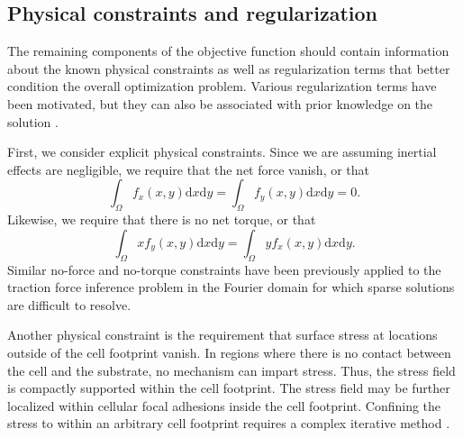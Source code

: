 \documentclass[aps,prl,reprint,groupedaddress,twocolumn]{revtex4-1}
\def\dd{\mbox{d}}
\begin{document}
\subsection{Physical constraints and regularization}

The remaining components of the objective function should contain
information about the known physical constraints as well as
regularization terms that better condition the overall optimization
problem. Various regularization terms have been motivated, but they
can also be associated with prior knowledge on the solution
\cite{PATHINTEGRAL}. 

First, we consider explicit physical constraints. Since we are
assuming inertial effects are negligible, we require that the net
force vanish, or that
\begin{equation}
\int_\Omega f_{x}(x,y)\dd x \dd y= \int_\Omega f_{y}(x,y)\dd x \dd y = 0.
\label{NOFORCE}
\end{equation}
Likewise, we require that there is no net torque, or that
\begin{equation}
\int_\Omega x f_{y}(x,y) \dd x \dd y  = \int_\Omega y f_{x}(x,y) \dd x \dd y.
\label{NOTORQUE}
\end{equation}
%
Similar no-force and no-torque constraints have been previously
applied to the traction force inference problem in the Fourier domain
\cite{BUTLER2002} for which sparse solutions are difficult to resolve.

Another physical constraint is the requirement that surface stress at
locations outside of the cell footprint vanish.  In regions where
there is no contact between the cell and the substrate, no mechanism
can impart stress.  Thus, the stress field is compactly supported
within the cell footprint.  The stress field may be further localized
within cellular focal adhesions inside the cell footprint. Confining
the stress to within an arbitrary cell footprint requires a complex
iterative method \cite{BUTLER2002}.
\end{document}
